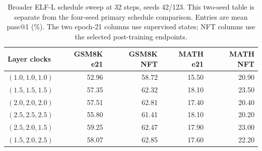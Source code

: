 \begin{table}[t]
\caption{Broader ELF-L schedule sweep at 32 steps, seeds 42/123. This two-seed table is separate from the four-seed primary schedule comparison. Entries are mean pass@1 (\%). The two epoch-21 columns use supervised states; NFT columns use the selected post-training endpoints.}
\label{tab:schedulestwoseed}
\centering\small
\begin{tabular}{lrrrr}
\toprule
Layer clocks & GSM8K e21 & GSM8K NFT & MATH e21 & MATH NFT \\
\midrule
$(1.0,1.0,1.0)$ & 52.96 & 58.72 & 15.50 & 20.90 \\
$(1.5,1.5,1.5)$ & 57.35 & 62.32 & 18.10 & 23.50 \\
$(2.0,2.0,2.0)$ & 57.51 & 62.81 & 17.40 & 20.40 \\
$(2.5,2.5,2.5)$ & 55.80 & 61.41 & 18.10 & 20.20 \\
$(2.5,2.0,1.5)$ & 59.25 & 62.47 & 17.90 & 23.00 \\
$(1.5,2.0,2.5)$ & 58.07 & 62.85 & 17.60 & 22.20 \\
\bottomrule
\end{tabular}
\end{table}
